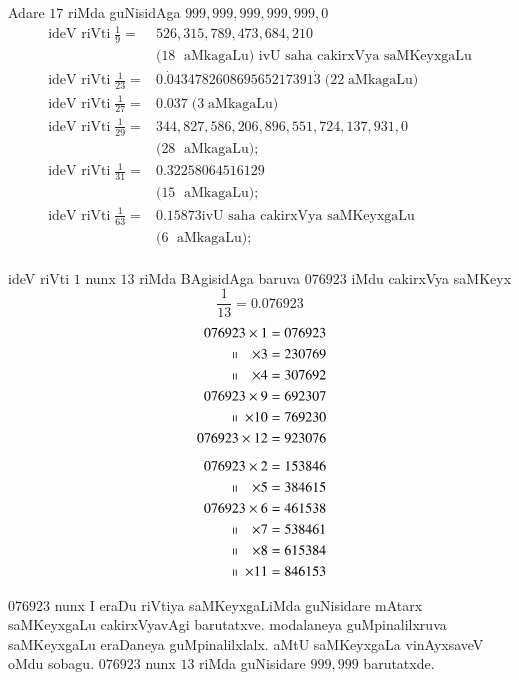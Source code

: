Adare $17$ riMda guNisidAga $999,999,999,999,999,0$
\begin{align*}
\text{ideV riVti} \;\frac{1}{9} =& 526, 315, 789, 473, 684, 210\\
&(18\; \text{ aMkagaLu)  ivU saha cakirxVya saMKeyxgaLu}\\[0.1cm]
\text{ideV riVti}\; \frac{1}{23} = & 0.{\dot 0}43478260869565217391{\dot 3}\; (22 \;\text{aMkagaLu)}\\
\text{ideV riVti} \;\frac{1}{27} = & 0.037 \;(3 \;\text{aMkagaLu)}\\
\text{ideV riVti} \;\frac{1}{29} = & 344,827,586,206,896,551,724,137,931,0\\
&(28\; \text{ aMkagaLu)};\\
\text{ideV riVti} \;\frac{1}{31}=& 0.32258064516129\\
&(15\; \text{ aMkagaLu)};\\
\text{ideV riVti}\;\frac{1}{63}=& 0.15873 \text{ivU saha cakirxVya saMKeyxgaLu}\\
 &(6\; \text{ aMkagaLu)};\\
\end{align*}


ideV riVti $1$ nunx $13$ riMda BAgisidAga baruva $076923$ iMdu cakirxVya saMKeyx
$$
\frac{1}{13} = 0.076923
$$
\begin{align*}
076923 \times 1 &= 076923 \\
~~~~~~~~~\shortparallel ~~~\times 3 &= 230769 \\ 
~~~~~~~~~\shortparallel ~~~\times 4 &= 307692 \\
076923\times 9 &= 692307 \\ 
~~~~~~~~~~~\shortparallel ~\times 10 &= 769230 \\
076923\times 12 &= 923076\\[5pt] 
076923 \times 2 &= 153846 \\
~~~~~~~~~\shortparallel ~~~\times 5 &= 384615 \\
076923   \times 6 &= 461538 \\
~~~~~~~~~\shortparallel ~~~\times 7 &= 538461 \\
~~~~~~~~~\shortparallel ~~~\times 8 &= 615384 \\
~~~~~~~~~~~\shortparallel ~\times 11 &= 846153 
\end{align*}

$076923$ nunx  I eraDu riVtiya saMKeyxgaLiMda guNisidare mAtarx saMKeyxgaLu cakirxVyavAgi barutatxve. modalaneya guMpinalilxruva saMKeyxgaLu eraDaneya guMpinalilxlalx. aMtU saMKeyxgaLa vinAyxsaveV oMdu sobagu. $076923$ nunx $13$ riMda guNisidare $999,999$ barutatxde.
